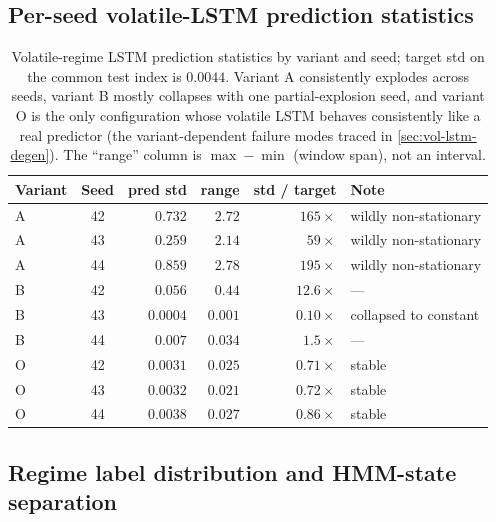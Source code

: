\documentclass{article}
\begin{document}
\subsection{Per-seed volatile-LSTM prediction statistics}
\label{app:f2}

\begin{table}[H]
\centering
\caption{Volatile-regime LSTM prediction statistics by variant and seed; target std on the common test index is $0.0044$. Variant A consistently explodes across seeds, variant B mostly collapses with one partial-explosion seed, and variant O is the only configuration whose volatile LSTM behaves consistently like a real predictor (the variant-dependent failure modes traced in \cref{sec:vol-lstm-degen}). The ``range'' column is $\max - \min$ (window span), not an interval.}
\label{tab:f2}
\small
\begin{tabular}{@{}lcrrrl@{}}
\toprule
Variant & Seed & pred std & range & std / target & Note \\
\midrule
A & 42 & $0.732$  & $2.72$  & $165\times$  & wildly non-stationary \\
A & 43 & $0.259$  & $2.14$  & $59\times$   & wildly non-stationary \\
A & 44 & $0.859$  & $2.78$  & $195\times$  & wildly non-stationary \\
B & 42 & $0.056$  & $0.44$  & $12.6\times$ & --- \\
B & 43 & $0.0004$ & $0.001$ & $0.10\times$ & collapsed to constant \\
B & 44 & $0.007$  & $0.034$ & $1.5\times$  & --- \\
O & 42 & $0.0031$ & $0.025$ & $0.71\times$ & stable \\
O & 43 & $0.0032$ & $0.021$ & $0.72\times$ & stable \\
O & 44 & $0.0038$ & $0.027$ & $0.86\times$ & stable \\
\bottomrule
\end{tabular}
\end{table}

\subsection{Regime label distribution and HMM-state separation}
\label{app:regime}
\end{document}
